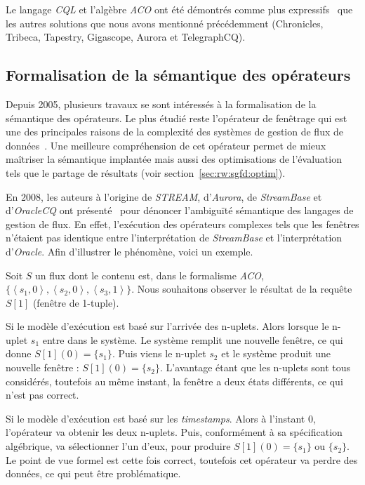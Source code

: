 Le langage \textit{CQL} et l'algèbre \textit{ACO} ont été démontrés comme plus expressifs~\cite{Arasu:cql} que les autres solutions que nous avons mentionné précédemment (Chronicles, Tribeca, Tapestry, Gigascope, Aurora et TelegraphCQ).

\subsection{Formalisation de la sémantique des opérateurs}\label{sec:rw:sgfd:modeles:batch}
Depuis 2005, plusieurs travaux se sont intéressés à la formalisation de la sémantique des opérateurs. Le plus étudié reste l'opérateur de fenêtrage qui est une des principales raisons de la complexité des systèmes de gestion de flux de données~\cite{Maier:semantics,Patroumpas:window,Patroumpas:subsumewindows}. Une meilleure compréhension de cet opérateur permet de mieux maîtriser la sémantique implantée mais aussi des optimisations de l'évaluation tels que le partage de résultats (voir section~\ref{sec:rw:sgfd:optim}).

En 2008, les auteurs à l'origine de \textit{STREAM}, d'\textit{Aurora}, de \textit{StreamBase} et d'\textit{OracleCQ} ont présenté~\cite{Jain:spread} pour dénoncer l'ambiguïté sémantique des langages de gestion de flux. En effet, l'exécution des opérateurs complexes tels que les fenêtres n'étaient pas identique entre l'interprétation de \textit{StreamBase} et l'interprétation d'\textit{Oracle}. Afin d'illustrer le phénomène, voici un exemple.

\begin{example}\label{ex:rw:sgfd:batches}
 Soit $S$ un flux dont le contenu est, dans le formalisme \textit{ACO}, $\{\left<s_1,0\right>, \left<s_2,0\right>, \left<s_3,1\right>\}$. Nous souhaitons observer le résultat de la requête $S[1]$ (fenêtre de 1-tuple).

Si le modèle d'exécution est basé sur l'arrivée des n-uplets. Alors lorsque le n-uplet $s_1$ entre dans le système. Le système remplit une nouvelle fenêtre, ce qui donne $S[1](0)=\{s_1\}$. Puis viens le n-uplet $s_2$ et le système produit une nouvelle fenêtre : $S[1](0)=\{s_2\}$. L'avantage étant que les n-uplets sont tous considérés, toutefois au même instant, la fenêtre a deux états différents, ce qui n'est pas correct.

Si le modèle d'exécution est basé sur les \textit{timestamps}. Alors à l'instant 0, l'opérateur va obtenir les deux n-uplets. Puis, conformément à sa spécification algébrique, va sélectionner l'un d'eux, pour produire $S[1](0) = \{s_1\}$ ou $\{s_2\}$. Le point de vue formel est cette fois correct, toutefois cet opérateur va perdre des données, ce qui peut être problématique.
\end{example}


